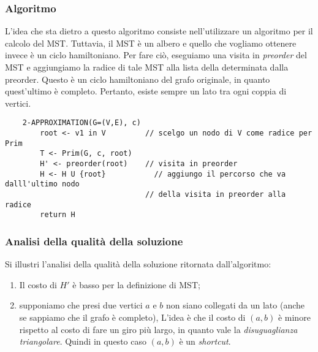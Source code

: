 \subsubsection{Algoritmo}

L'idea che sta dietro a questo algoritmo consiste nell'utilizzare un algoritmo per il calcolo
del MST. Tuttavia, il MST è un albero e quello che vogliamo ottenere invece è un
ciclo hamiltoniano. Per fare ciò, eseguiamo una visita in \textit{preorder} del MST
e aggiungiamo la radice di tale MST alla lista della determinata dalla preorder. Questo è un ciclo
hamiltoniano del grafo originale, in quanto quest'ultimo è completo. Pertanto, esiste sempre un
lato tra ogni coppia di vertici.

\begin{verbatim}
    2-APPROXIMATION(G=(V,E), c)
        root <- v1 in V         // scelgo un nodo di V come radice per Prim
        T <- Prim(G, c, root)
        H' <- preorder(root)    // visita in preorder
        H <- H U {root}           // aggiungo il percorso che va dalll'ultimo nodo
                                // della visita in preorder alla radice
        return H

\end{verbatim}

\subsubsection{Analisi della qualità della soluzione}

Si illustri l'analisi della qualità della soluzione ritornata dall'algoritmo:
\begin{enumerate}
    \item Il costo di $H'$ è basso per la definizione di MST;
    \item supponiamo che presi due vertici $a$ e $b$ non siano collegati da un lato (anche se
    sappiamo che il grafo è completo), L'idea è che il costo di $(a, b)$ è minore rispetto
    al costo di fare un giro più largo, in quanto vale la \textit{disuguaglianza triangolare}.
    Quindi in questo caso $(a, b)$ è un \textit{shortcut}.
\end{enumerate}

